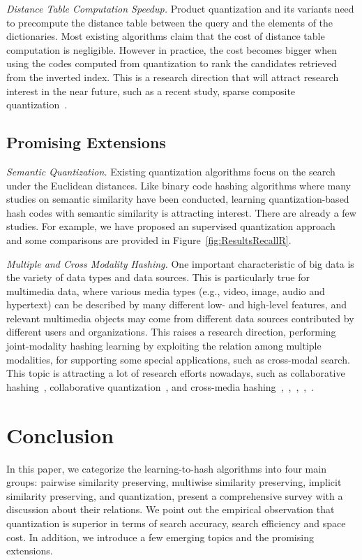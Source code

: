 \documentclass[10pt,journal,compsoc]{IEEEtran}
\begin{document}
\emph{Distance Table Computation Speedup.}
Product quantization and its variants
need to precompute the distance table
between the query and the elements of the dictionaries.
Most existing algorithms claim that
the cost of distance table computation is negligible.
However in practice, the cost becomes bigger
when using the codes computed from quantization
to rank the candidates retrieved from the inverted index.
This is a research direction that will attract research interest in the near future,
such as a recent study, sparse composite quantization~\cite{ZhangQTW15}.



\subsection{Promising Extensions}
\emph{Semantic Quantization.}
Existing quantization algorithms focus on
the search under the Euclidean distances.
Like binary code hashing algorithms
where many studies on semantic similarity have been conducted,
learning quantization-based hash codes with semantic similarity
is attracting interest.
There are already a few studies.
For example, we have proposed an supervised quantization approach~\cite{WangZQTW16}
and some comparisons are provided in Figure~\ref{fig:ResultsRecallR}.

\emph{Multiple and Cross Modality Hashing.}
One important characteristic of big data is the variety of data types and data sources. This
is particularly true for multimedia data, where various media types (e.g., video, image, audio
and hypertext) can be described by many different low- and high-level features, and relevant
multimedia objects may come from different data sources contributed by different users and
organizations.
This raises a research direction,
performing joint-modality hashing learning
by exploiting the relation among multiple modalities,
for supporting some special applications, such as
cross-modal search.
This topic is attracting a lot of research efforts nowadays,
such as
collaborative hashing~\cite{LiuHDL14, ZhangSLHLC16},
collaborative quantization~\cite{ZhangW16},
and cross-media hashing~\cite{SongYHSL13},~\cite{SongYYHS13},~\cite{ZhuHSZ13},~\cite{XuSYSL17},~\cite{LiuLSSDH17}.






\section{Conclusion}
\label{sec:con}
In this paper,
we categorize the learning-to-hash algorithms
into four main groups:
pairwise similarity preserving,
multiwise similarity preserving,
implicit similarity preserving,
and quantization,
present a comprehensive survey
with a discussion
about their relations.
We point out the empirical observation
that quantization is superior
in terms of search accuracy,
search efficiency
and space cost.
In addition, we introduce a few emerging topics and the promising extensions.






\end{document}
